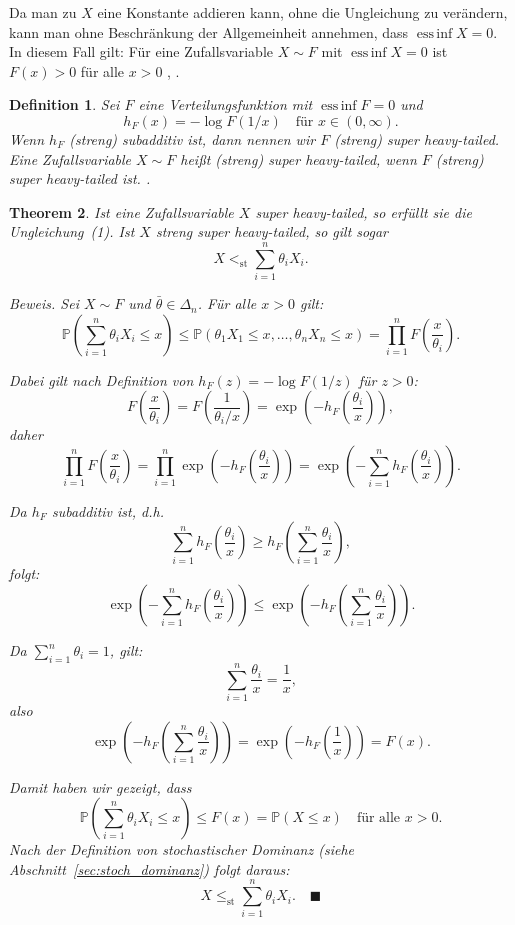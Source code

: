 \documentclass[
12pt,
fancyheadings, %
%
a4paper, 
%
]{tuhhreprt}
\newtheorem{definition}{Definition}[chapter]
\newtheorem{theorem}[definition]{Theorem}
\begin{document}
Da man zu \(X\) eine Konstante addieren kann, ohne die Ungleichung zu verändern, kann man ohne Beschränkung der Allgemeinheit annehmen, dass \(\operatorname{ess\,inf} X = 0\). In diesem Fall gilt: Für eine Zufallsvariable \(X \sim F\) mit \(\operatorname{ess\,inf} X = 0\) ist \(F(x) > 0\) für alle \(x > 0\) \cite[Abschnitt~3]{ChenShneer2024}, \cite[Abschnitt~2]{ChenShneer2024}.

\begin{definition}\cite[Definition 2.]{ChenShneer2024}
Sei \( F \) eine Verteilungsfunktion mit \(\operatorname{ess\,inf} F = 0\) und
\[
h_F(x) = -\log F(1/x) \quad \text{für } x \in (0, \infty).
\]
Wenn \( h_F \) (streng) subadditiv ist, dann nennen wir \( F \) (streng) \textit{super heavy-tailed}.  
Eine Zufallsvariable \( X \sim F \) heißt (streng) \textit{super heavy-tailed}, wenn \( F \) (streng) \textit{super heavy-tailed} ist.  .
\end{definition}

\begin{theorem}\cite[Theorem 1.]{ChenShneer2024}
Ist eine Zufallsvariable \( X \) \textit{super heavy-tailed}, so erfüllt sie die Ungleichung~(1).  
Ist \( X \) \textit{streng super heavy-tailed}, so gilt sogar
\[
X <_{\mathrm{st}} \sum_{i=1}^{n} \theta_i X_i.
\]

\textit{Beweis.}
Sei \( X \sim F \) und \( \bar{\theta} \in \Delta_n \). Für alle \( x > 0 \) gilt:
\[
\mathbb{P} \left( \sum_{i=1}^{n} \theta_i X_i \le x \right)
\le \mathbb{P}(\theta_1 X_1 \le x, \ldots, \theta_n X_n \le x)
= \prod_{i=1}^{n} F\left( \frac{x}{\theta_i} \right).
\]

Dabei gilt nach Definition von \( h_F(z) = -\log F(1/z) \) für \( z > 0 \):
\[
F\left( \frac{x}{\theta_i} \right) = F\left( \frac{1}{\theta_i / x} \right) = \exp\left( -h_F\left( \frac{\theta_i}{x} \right) \right),
\]
daher
\[
\prod_{i=1}^{n} F\left( \frac{x}{\theta_i} \right)
= \prod_{i=1}^{n} \exp\left( -h_F\left( \frac{\theta_i}{x} \right) \right)
= \exp\left( -\sum_{i=1}^{n} h_F\left( \frac{\theta_i}{x} \right) \right).
\]

Da \( h_F \) subadditiv ist, d.h.
\[
\sum_{i=1}^{n} h_F\left( \frac{\theta_i}{x} \right) \ge h_F\left( \sum_{i=1}^{n} \frac{\theta_i}{x} \right),
\]
folgt:
\[
\exp\left( -\sum_{i=1}^{n} h_F\left( \frac{\theta_i}{x} \right) \right)
\le \exp\left( -h_F\left( \sum_{i=1}^{n} \frac{\theta_i}{x} \right) \right).
\]

Da \( \sum_{i=1}^{n} \theta_i = 1 \), gilt:
\[
\sum_{i=1}^{n} \frac{\theta_i}{x} = \frac{1}{x},
\]
also
\[
\exp\left( -h_F\left( \sum_{i=1}^{n} \frac{\theta_i}{x} \right) \right)
= \exp\left( -h_F\left( \frac{1}{x} \right) \right) = F(x).
\]

Damit haben wir gezeigt, dass
\[
\mathbb{P} \left( \sum_{i=1}^{n} \theta_i X_i \le x \right) \le F(x) = \mathbb{P}(X \le x)
\quad \text{für alle } x > 0.
\]
Nach der Definition von stochastischer Dominanz (siehe Abschnitt~\ref{sec:stoch_dominanz}) folgt daraus:
\[
X \le_{\mathrm{st}} \sum_{i=1}^{n} \theta_i X_i. \quad \blacksquare
\] 


\end{theorem}
\end{document}
